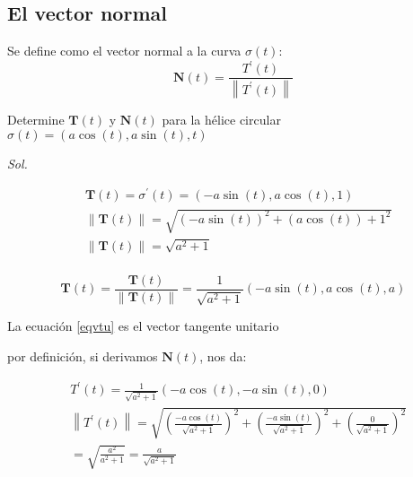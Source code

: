 \subsection{El vector normal}

\begin{definition}
	Se define como el vector normal a la curva $\sigma(t)$:
	\begin{equation}
		\boldsymbol{N}(t)=\frac{T^{\prime}(t)}{\left\lVert T^{\prime}(t)\right\rVert }
	\end{equation}
\end{definition}


\begin{example}
	Determine $\boldsymbol{T}(t)$ y $\boldsymbol{N}(t)$ para la hélice circular $\sigma(t)=\left(a\cos{(t)},a\sin{(t)},t\right)$
\end{example}

\textit{ Sol. }

\begin{align*}
	 & \boldsymbol{T}(t)=\sigma^{\prime}(t)=\left(-a\sin{(t)},a\cos{(t)},1\right)                               \\
	 & \left\lVert \boldsymbol{T}(t)\right\rVert =\sqrt{\left(-a\sin{(t)}\right)^2+\left(a\cos{(t)}\right)+1^2} \\
	 & \left\lVert \boldsymbol{T}(t)\right\rVert =\sqrt{a^2+1}                                                  \\
\end{align*}

\begin{equation}
	\label{eqvtu}
	\boldsymbol{T}(t)=\frac{\boldsymbol{T}(t)}{\left\lVert \boldsymbol{T}(t)\right\rVert }=\frac{1}{\sqrt{a^2+1}}\left(-a\sin{(t)},a\cos{(t)},a\right)
\end{equation}

La ecuación \eqref{eqvtu} es el vector tangente unitario

por definición, si derivamos $\boldsymbol{N}(t)$, nos da:

\begin{align*}
	 & T^{\prime}(t)=\frac{1}{\sqrt{a^2+1}}\left(-a\cos{(t)},-a\sin{(t)},0\right)                                                                                                         \\
	 & \left\lVert T^{\prime}(t)\right\rVert=\sqrt{\left(\frac{-a\cos{(t)}}{\sqrt{a^2+1}}\right)^2+\left(\frac{-a\sin{(t)}}{\sqrt{a^2+1}}\right)^2+\left(\frac{0}{\sqrt{a^2+1}}\right)^2} \\
	 & =\sqrt{\frac{a^2}{a^2+1}}=\frac{a}{\sqrt{a^2+1}}
\end{align*}

